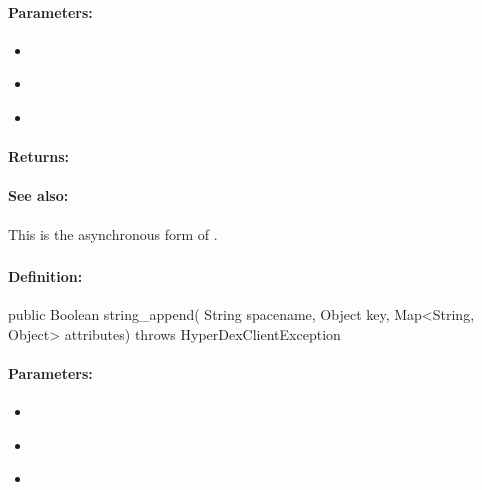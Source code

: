 \paragraph{Parameters:}
\begin{itemize}[noitemsep]
\item {}\\

\item {}\\

\item {}\\

\end{itemize}

\paragraph{Returns:}


\paragraph{See also:}  This is the asynchronous form of .

\pagebreak
\subsubsection{}
\label{api:java:string_append}


\paragraph{Definition:}
\begin{javacode}
public Boolean string_append(
        String spacename,
        Object key,
        Map<String, Object> attributes) throws HyperDexClientException
\end{javacode}

\paragraph{Parameters:}
\begin{itemize}[noitemsep]
\item {}\\

\item {}\\

\item {}\\

\end{itemize}

